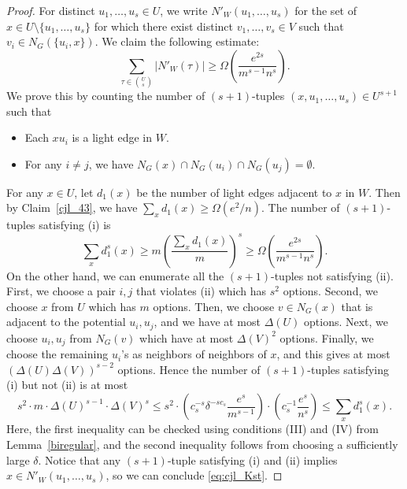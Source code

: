 \documentclass[11pt]{article}
\theoremstyle{definition}
\begin{document}
\begin{proof}
    For distinct $u_1,\dots,u_s \in U$, we write $N'_W(u_1,\dots,u_s)$ for the set of $x\in U \setminus \{u_1,\dots,u_s\}$ for which there exist distinct $v_1,\dots,v_s \in V$ such that $v_i\in N_{G}(\{u_i,x\})$. We claim the following estimate: \begin{equation}\label{eq:cjl_Kst}
        \sum_{\tau\in \binom{U}{s}}|N'_W(\tau)| \geq \Omega\left(\frac{e^{2s}}{m^{s-1}n^{s}}\right).
    \end{equation} We prove this by counting the number of $(s+1)$-tuples $(x,u_1,\dots,u_s) \in U^{s+1}$ such that \begin{itemize}
        \item[(i)] Each $xu_i$ is a light edge in $W$.
        \item[(ii)] For any $i \neq j$, we have $N_G(x)\cap N_G(u_i)\cap N_G(u_j) = \emptyset$.
    \end{itemize} For any $x\in U$, let $d_1(x)$ be the number of light edges adjacent to $x$ in $W$. Then by Claim~\ref{cjl_43}, we have $\sum_x d_1(x) \geq \Omega(e^2/n)$. The number of $(s+1)$-tuples satisfying (i) is \begin{equation*}
        \sum_x d_1^s(x) \geq m \left(\frac{\sum_x d_1(x)}{m}\right)^s \geq \Omega\left(\frac{e^{2s}}{m^{s-1}n^{s}}\right).
    \end{equation*} On the other hand, we can enumerate all the $(s+1)$-tuples not satisfying (ii). First, we choose a pair $i,j$ that violates (ii) which has $s^2$ options. Second, we choose $x$ from $U$ which has $m$ options. Then, we choose $v\in N_G(x)$ that is adjacent to the potential $u_i,u_j$, and we have at most $\Delta(U)$ options. Next, we choose $u_i,u_j$ from $N_G(v)$ which have at most $\Delta(V)^2$ options. Finally, we choose the remaining $u_i$'s as neighbors of neighbors of $x$, and this gives at most $(\Delta(U)\Delta(V))^{s-2}$ options. Hence the number of $(s+1)$-tuples satisfying (i) but not (ii) is at most \begin{equation*}
        s^2 \cdot m \cdot \Delta(U)^{s-1} \cdot \Delta(V)^{s} \leq s^2 \cdot \left( c_s^{-s} \delta^{-sc_s}\frac{e^s}{m^{s-1}} \right) \cdot \left( c_s^{-1} \frac{e^s}{n^s} \right) \leq \sum_x d_1^s(x).
    \end{equation*}
    Here, the first inequality can be checked using conditions (III) and (IV) from Lemma~\ref{biregular}, and the second inequality follows from choosing a sufficiently large $\delta$. Notice that any $(s+1)$-tuple satisfying (i) and (ii) implies $x\in N'_W(u_1,\dots,u_s)$, so we can conclude \eqref{eq:cjl_Kst}.


\end{proof}
\end{document}
